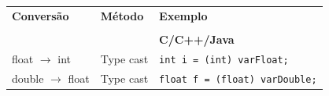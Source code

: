 \documentclass[12pt,a4paper]{article}
\begin{document}
\begin{longtable}[]{@{}lll@{}}
\toprule
\endhead
\begin{minipage}[t]{0.21\columnwidth}\raggedright
\textbf{Conversão}\strut
\end{minipage} & \begin{minipage}[t]{0.22\columnwidth}\raggedright
\textbf{Método}\strut
\end{minipage} & \begin{minipage}[t]{0.48\columnwidth}\raggedright
\textbf{Exemplo}\strut
\end{minipage}\tabularnewline
\begin{minipage}[t]{0.21\columnwidth}\raggedright
\strut
\end{minipage} & \begin{minipage}[t]{0.22\columnwidth}\raggedright
\strut
\end{minipage} & \begin{minipage}[t]{0.48\columnwidth}\raggedright
\strut
\end{minipage}\tabularnewline
\begin{minipage}[t]{0.21\columnwidth}\raggedright
\strut
\end{minipage} & \begin{minipage}[t]{0.22\columnwidth}\raggedright
\strut
\end{minipage} & \begin{minipage}[t]{0.48\columnwidth}\raggedright
\textbf{C/C++/Java}\strut
\end{minipage}\tabularnewline
\begin{minipage}[t]{0.21\columnwidth}\raggedright
float \(\rightarrow\) int\strut
\end{minipage} & \begin{minipage}[t]{0.22\columnwidth}\raggedright
Type cast\strut
\end{minipage} & \begin{minipage}[t]{0.48\columnwidth}\raggedright
\texttt{int\ i\ =\ (int)\ varFloat;}\strut
\end{minipage}\tabularnewline
\begin{minipage}[t]{0.21\columnwidth}\raggedright
double \(\rightarrow\) float\strut
\end{minipage} & \begin{minipage}[t]{0.22\columnwidth}\raggedright
Type cast\strut
\end{minipage} & \begin{minipage}[t]{0.48\columnwidth}\raggedright
\texttt{float\ f\ =\ (float)\ varDouble;}\strut

\end{minipage}
\end{longtable}
\end{document}
